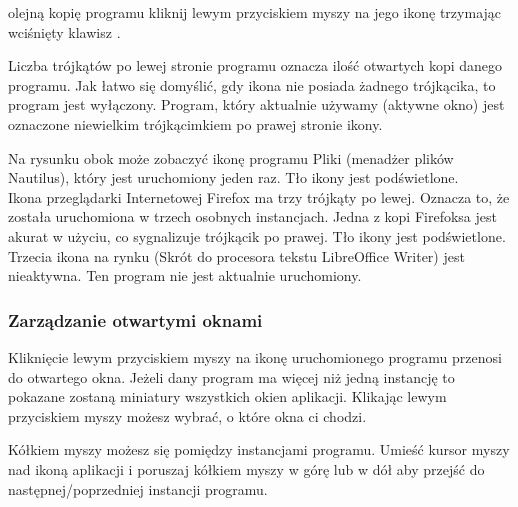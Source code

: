 olejną kopię programu kliknij lewym przyciskiem myszy na jego ikonę trzymając wciśnięty klawisz .

\noindent Liczba trójkątów po lewej stronie programu oznacza ilość otwartych kopi danego programu. Jak łatwo się domyślić, gdy ikona nie posiada żadnego trójkącika, to program jest wyłączony. Program, który aktualnie używamy (aktywne okno) jest oznaczone niewielkim trójkącimkiem po prawej stronie ikony.

\noindent Na rysunku obok może zobaczyć ikonę programu Pliki (menadżer plików Nautilus), który jest uruchomiony jeden raz. Tło ikony jest podświetlone.\\
Ikona przeglądarki Internetowej Firefox ma trzy trójkąty po lewej. Oznacza to, że została uruchomiona w trzech osobnych instancjach. Jedna z kopi Firefoksa jest akurat w użyciu, co sygnalizuje trójkącik po prawej. Tło ikony jest podświetlone.\\
Trzecia ikona na rynku (Skrót do procesora tekstu LibreOffice Writer) jest nieaktywna. Ten program nie jest aktualnie uruchomiony.

\subsubsection{Zarządzanie otwartymi oknami}
Kliknięcie lewym przyciskiem myszy na ikonę uruchomionego programu przenosi do otwartego okna. Jeżeli dany program ma więcej niż jedną instancję to pokazane zostaną miniatury wszystkich okien aplikacji. Klikając lewym przyciskiem myszy możesz wybrać, o które okna ci chodzi. 

Kółkiem myszy możesz się pomiędzy instancjami programu. Umieść kursor myszy nad ikoną aplikacji i poruszaj kółkiem myszy w górę lub w dół aby przejść do następnej/poprzedniej instancji programu.

